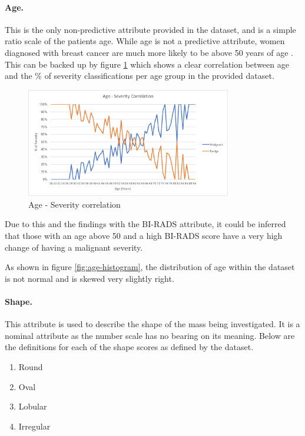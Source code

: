 \documentclass[12pt]{article}
\begin{document}
    \paragraph{Age.}
      This is the only non-predictive attribute provided in the dataset, and is a simple ratio scale of the patients age. While age is not a predictive attribute, women diagnosed with breast cancer are much more likely to be above 50 years of age \citep{kerlikowske1993mammography}. This can be backed up by figure \ref{fig:age-severity-correlation} which shows a clear correlation between age and the \% of severity classifications per age group in the provided dataset.

      \begin{figure}[H]
        \centering
        \includegraphics[width=0.8\textwidth]{age-severity-correlation}
        \caption{Age - Severity correlation}
        \label{fig:age-severity-correlation}
      \end{figure}

      Due to this and the findings with the BI-RADS attribute, it could be inferred that those with an age above 50 and a high BI-RADS score have a very high change of having a malignant severity.

      As shown in figure \ref{fig:age-histogram}, the distribution of age within the dataset is not normal and is skewed very slightly right.

    \paragraph{Shape.}
      This attribute is used to describe the shape of the mass being investigated. It is a nominal attribute as the number scale has no bearing on its meaning. Below are the definitions for each of the shape scores as defined by the dataset.

      \singlespacing
      \begin{enumerate}[label=\arabic*)]
        \item Round
        \item Oval
        \item Lobular
        \item Irregular
      \end{enumerate}
      \doublespacing
\end{document}
